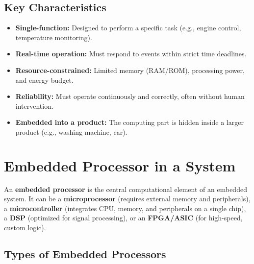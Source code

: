 \documentclass[12pt,a4paper]{article}
\begin{document}
\subsection{Key Characteristics}
\begin{itemize}[leftmargin=*, itemsep=3pt]
  \item \textbf{Single-function:} Designed to perform a specific task (e.g., engine control, temperature monitoring).
  \item \textbf{Real-time operation:} Must respond to events within strict time deadlines.
  \item \textbf{Resource-constrained:} Limited memory (RAM/ROM), processing power, and energy budget.
  \item \textbf{Reliability:} Must operate continuously and correctly, often without human intervention.
  \item \textbf{Embedded into a product:} The computing part is hidden inside a larger product (e.g., washing machine, car).
\end{itemize}

\section{Embedded Processor in a System}

\begin{tcolorbox}[defbox, title={\textbf{Embedded Processor}}]
An \textbf{embedded processor} is the central computational element of an embedded system. It can be a \textbf{microprocessor} (requires external memory and peripherals), a \textbf{microcontroller} (integrates CPU, memory, and peripherals on a single chip), a \textbf{DSP} (optimized for signal processing), or an \textbf{FPGA/ASIC} (for high-speed, custom logic).
\end{tcolorbox}

\subsection{Types of Embedded Processors}
\end{document}
